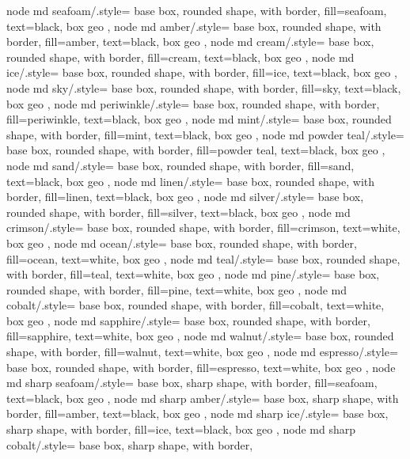 {	%
	node md seafoam/.style={
		base box, rounded shape, with border,
		fill=seafoam, text=black, box geo
	},
	node md amber/.style={
		base box, rounded shape, with border,
		fill=amber, text=black, box geo
	},
	node md cream/.style={
		base box, rounded shape, with border,
		fill=cream, text=black, box geo
	},
	node md ice/.style={
		base box, rounded shape, with border,
		fill=ice, text=black, box geo
	},
	node md sky/.style={
		base box, rounded shape, with border,
		fill=sky, text=black, box geo
	},
	node md periwinkle/.style={
		base box, rounded shape, with border,
		fill=periwinkle, text=black, box geo
	},
	node md mint/.style={
		base box, rounded shape, with border,
		fill=mint, text=black, box geo
	},
	node md powder teal/.style={
		base box, rounded shape, with border,
		fill=powder teal, text=black, box geo
	},
	node md sand/.style={
		base box, rounded shape, with border,
		fill=sand, text=black, box geo
	},
	node md linen/.style={
		base box, rounded shape, with border,
		fill=linen, text=black, box geo
	},
	node md silver/.style={
		base box, rounded shape, with border,
		fill=silver, text=black, box geo
	},
	node md crimson/.style={
		base box, rounded shape, with border,
		fill=crimson, text=white, box geo
	},
	node md ocean/.style={
		base box, rounded shape, with border,
		fill=ocean, text=white, box geo
	},
	node md teal/.style={
		base box, rounded shape, with border,
		fill=teal, text=white, box geo
	},
	node md pine/.style={
		base box, rounded shape, with border,
		fill=pine, text=white, box geo
	},
	node md cobalt/.style={
		base box, rounded shape, with border,
		fill=cobalt, text=white, box geo
	},
	node md sapphire/.style={
		base box, rounded shape, with border,
		fill=sapphire, text=white, box geo
	},
	node md walnut/.style={
		base box, rounded shape, with border,
		fill=walnut, text=white, box geo
	},
	node md espresso/.style={
		base box, rounded shape, with border,
		fill=espresso, text=white, box geo
	},
	node md sharp seafoam/.style={
		base box, sharp shape, with border,
		fill=seafoam, text=black, box geo
	},
	node md sharp amber/.style={
		base box, sharp shape, with border,
		fill=amber, text=black, box geo
	},
	node md sharp ice/.style={
		base box, sharp shape, with border,
		fill=ice, text=black, box geo
	},
	node md sharp cobalt/.style={
		base box, sharp shape, with border,
}}
